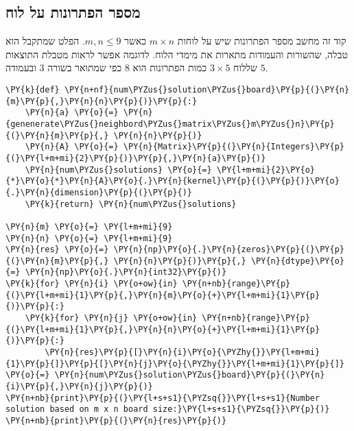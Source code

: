 \newpage
    \hypertarget{solution-amount}{%
\subsection{מספר הפתרונות על לוח}\label{solution-amount}}
קוד זה מחשב מספר הפתרונות שיש על לוחות 
$m\times n$ 
כאשר 
$m,n \le 9$.
הפלט שמתקבל הוא טבלה, שהשורות והעמודות מתארות את מימדי
הלוח.
לדוגמה אפשר לראות מטבלת התוצאות שללוח 
$3 \times 5$
כמות הפתרונות הוא 
$8$
כפי שמתואר בשורה 
$3$
ובעמודה
$5$.
\begin{english}
    \begin{tcolorbox}[breakable, size=fbox, boxrule=1pt, pad at break*=1mm,colback=cellbackground, colframe=cellborder]
\begin{Verbatim}[commandchars=\\\{\}]
\PY{k}{def} \PY{n+nf}{num\PYZus{}solution\PYZus{}board}\PY{p}{(}\PY{n}{m}\PY{p}{,}\PY{n}{n}\PY{p}{)}\PY{p}{:}
    \PY{n}{a} \PY{o}{=} \PY{n}{genenerate\PYZus{}neighbord\PYZus{}matrix\PYZus{}m\PYZus{}n}\PY{p}{(}\PY{n}{m}\PY{p}{,} \PY{n}{n}\PY{p}{)}
    \PY{n}{A} \PY{o}{=} \PY{n}{Matrix}\PY{p}{(}\PY{n}{Integers}\PY{p}{(}\PY{l+m+mi}{2}\PY{p}{)}\PY{p}{,}\PY{n}{a}\PY{p}{)}
    \PY{n}{num\PYZus{}solutions} \PY{o}{=} \PY{l+m+mi}{2}\PY{o}{*}\PY{o}{*}\PY{n}{A}\PY{o}{.}\PY{n}{kernel}\PY{p}{(}\PY{p}{)}\PY{o}{.}\PY{n}{dimension}\PY{p}{(}\PY{p}{)}
    \PY{k}{return} \PY{n}{num\PYZus{}solutions}

\PY{n}{m} \PY{o}{=} \PY{l+m+mi}{9}
\PY{n}{n} \PY{o}{=} \PY{l+m+mi}{9}
\PY{n}{res} \PY{o}{=} \PY{n}{np}\PY{o}{.}\PY{n}{zeros}\PY{p}{(}\PY{p}{(}\PY{n}{m}\PY{p}{,} \PY{n}{n}\PY{p}{)}\PY{p}{,} \PY{n}{dtype}\PY{o}{=} \PY{n}{np}\PY{o}{.}\PY{n}{int32}\PY{p}{)}
\PY{k}{for} \PY{n}{i} \PY{o+ow}{in} \PY{n+nb}{range}\PY{p}{(}\PY{l+m+mi}{1}\PY{p}{,}\PY{n}{m}\PY{o}{+}\PY{l+m+mi}{1}\PY{p}{)}\PY{p}{:}
    \PY{k}{for} \PY{n}{j} \PY{o+ow}{in} \PY{n+nb}{range}\PY{p}{(}\PY{l+m+mi}{1}\PY{p}{,}\PY{n}{n}\PY{o}{+}\PY{l+m+mi}{1}\PY{p}{)}\PY{p}{:}
        \PY{n}{res}\PY{p}{[}\PY{n}{i}\PY{o}{\PYZhy{}}\PY{l+m+mi}{1}\PY{p}{]}\PY{p}{[}\PY{n}{j}\PY{o}{\PYZhy{}}\PY{l+m+mi}{1}\PY{p}{]} \PY{o}{=} \PY{n}{num\PYZus{}solution\PYZus{}board}\PY{p}{(}\PY{n}{i}\PY{p}{,}\PY{n}{j}\PY{p}{)}
\PY{n+nb}{print}\PY{p}{(}\PY{l+s+s1}{\PYZsq{}}\PY{l+s+s1}{Number solution based on m x n board size:}\PY{l+s+s1}{\PYZsq{}}\PY{p}{)}
\PY{n+nb}{print}\PY{p}{(}\PY{n}{res}\PY{p}{)}
\end{Verbatim}
\end{tcolorbox}


\end{english}
